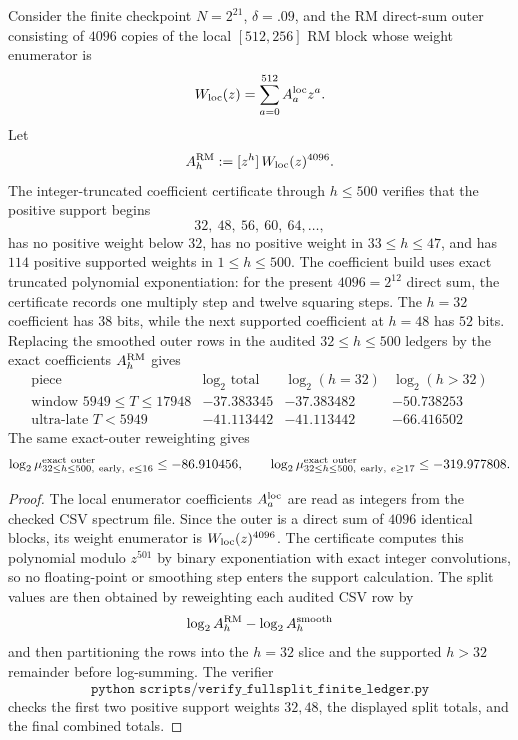 \begin{lemma}
\label{lem:rm-prefix-support-split}
Consider the finite checkpoint \(N=2^{21}\), \(\delta=.09\), and the RM direct-sum outer consisting of \(4096\)
copies of the local \([512,256]\) RM block whose weight enumerator is
\[
W_{\rm loc}(z)=\sum_{a=0}^{512} A_a^{\rm loc}z^a.
\]
Let
\[
A_h^{\rm RM}:=[z^h]\,W_{\rm loc}(z)^{4096}.
\]
The integer-truncated coefficient certificate through \(h\le500\) verifies that the positive support begins
\[
32,\ 48,\ 56,\ 60,\ 64,\ldots,
\]
has no positive weight below \(32\), has no positive weight in \(33\le h\le47\), and has \(114\) positive supported
weights in \(1\le h\le500\).  The coefficient build uses exact truncated polynomial exponentiation: for the present
\(4096=2^{12}\) direct sum, the certificate records one multiply step and twelve squaring steps.  The \(h=32\)
coefficient has \(38\) bits, while the next supported coefficient at \(h=48\) has \(52\) bits.  Replacing the smoothed
outer rows in the audited
\(32\le h\le500\) ledgers by the exact coefficients \(A_h^{\rm RM}\) gives
\[
\begin{array}{c|ccc}
\text{piece} & \log_2\text{ total} & \log_2(h=32) & \log_2(h>32)\\
\hline
\text{window }5949\le T\le17948 & -37.383345 & -37.383482 & -50.738253\\
\text{ultra-late }T<5949 & -41.113442 & -41.113442 & -66.416502
\end{array}
\]
The same exact-outer reweighting gives
\[
\log_2\mu_{32\le h\le500,\ {\rm early},\ e\le16}^{\rm exact\ outer}\le -86.910456,
\qquad
\log_2\mu_{32\le h\le500,\ {\rm early},\ e\ge17}^{\rm exact\ outer}\le -319.977808.
\]
\end{lemma}

\begin{proof}
The local enumerator coefficients \(A_a^{\rm loc}\) are read as integers from the checked CSV spectrum file.  Since the
outer is a direct sum of \(4096\) identical blocks, its weight enumerator is \(W_{\rm loc}(z)^{4096}\).  The certificate
computes this polynomial modulo \(z^{501}\) by binary exponentiation with exact integer convolutions, so no
floating-point or smoothing step enters the support calculation.  The split values are then obtained by reweighting each
audited CSV row by
\[
\log_2 A_h^{\rm RM}-\log_2 A_h^{\rm smooth}
\]
and then partitioning the rows into the \(h=32\) slice and the supported \(h>32\) remainder before log-summing.  The
verifier
\[
\texttt{python scripts/verify\_fullsplit\_finite\_ledger.py}
\]
checks the first two positive support weights \(32,48\), the displayed split totals, and the final combined totals.
\end{proof}

